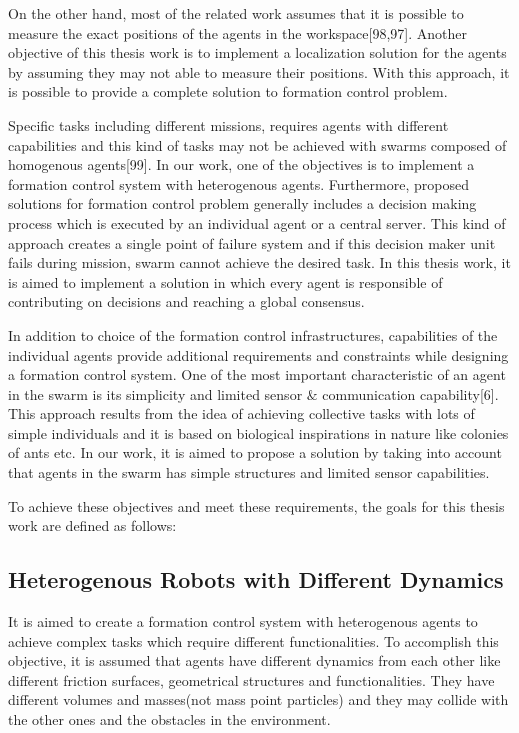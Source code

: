 On the other hand, most of the related work assumes that it is possible to measure the exact positions of the agents in the workspace[98,97]. Another objective of this thesis work is to implement a localization solution for the agents by assuming they may not able to measure their positions. With this approach, it is possible to provide a complete solution to formation control problem.

Specific tasks including different missions, requires agents with different capabilities and this kind of tasks may not be achieved with swarms composed of homogenous agents[99]. In our work, one of the objectives is to implement a formation control system with heterogenous agents. Furthermore, proposed solutions for formation control problem generally includes a decision making process which is executed by an individual agent or a central server. This kind of approach creates a single point of failure system and if this decision maker unit fails during mission, swarm cannot achieve the desired task. In this thesis work, it is aimed to implement a solution in which every agent is responsible of contributing on decisions and reaching a global consensus. 

In addition to choice of the formation control infrastructures, capabilities of the individual agents provide additional requirements and constraints while designing a formation control system. One of the most important characteristic of an agent in the swarm is its simplicity and limited sensor $\&$ communication capability[6]. This approach results from the idea of achieving collective tasks with lots of simple individuals  and it is based on biological inspirations in nature like colonies of ants etc. In our work, it is aimed to propose a solution by taking into account that agents in the swarm has simple structures and limited sensor capabilities.

To achieve these objectives and meet these requirements, the goals for this thesis work are defined as follows:

\subsection{Heterogenous Robots with Different Dynamics}
It is aimed to create a formation control system with heterogenous agents to achieve complex tasks which require different functionalities. To accomplish this objective, it is assumed that agents have different dynamics from each other like different friction surfaces, geometrical structures and functionalities. They have different volumes and masses(not mass point particles) and they may collide with the other ones and the obstacles in the environment.


